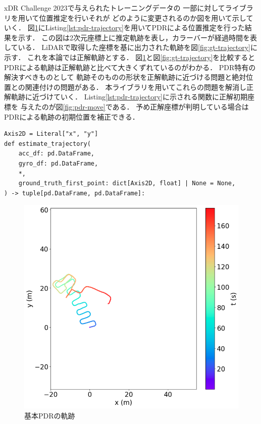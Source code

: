 xDR Challenge 2023で与えられたトレーニングデータの
一部に対してライブラリを用いて位置推定を行いそれが
どのように変更されるのか図を用いて示していく．
図\ref{fig:pdr}にListing\ref{lst:pdr-trajectory}を用いてPDRによる位置推定を行った結果を示す．
この図は2次元座標上に推定軌跡を表し，カラーバーが経過時間を表している．
LiDARで取得した座標を基に出力された軌跡を図\ref{fig:gt-trajectory}に示す．
これを本論では正解軌跡とする．
図\ref{fig:pdr}と図\ref*{fig:gt-trajectory}を比較するとPDRによる軌跡は正解軌跡と比べて大きくずれているのがわかる．
PDR特有の解決すべきものとして
軌跡そのものの形状を正解軌跡に近づける問題と絶対位置との関連付けの問題がある．
本ライブラリを用いてこれらの問題を解消し正解軌跡に近づけていく．
Listing\ref{lst:pdr-trajectory}に示される関数に正解初期座標を
与えたのが図\ref{fig:pdr-move}である．
予め正解座標が判明している場合はPDRによる軌跡の初期位置を補正できる．



\begin{lstlisting}[caption={基本PDR}, label=lst:pdr-trajectory,float =h]
Axis2D = Literal["x", "y"]
def estimate_trajectory(
    acc_df: pd.DataFrame,
    gyro_df: pd.DataFrame,
    *,
    ground_truth_first_point: dict[Axis2D, float] | None = None,
) -> tuple[pd.DataFrame, pd.DataFrame]:
\end{lstlisting}

\begin{figure}[ht]
	\centering
	\includegraphics[width=\linewidth]{image/pdr.jpg}
	\caption{基本PDRの軌跡}    \label{fig:pdr}
\end{figure}

